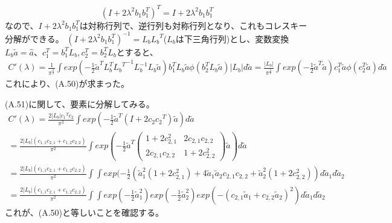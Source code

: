 \documentclass{jsarticle}
\begin{document}
\begin{equation}
(I + 2\lambda^2 b_1 b_1^T)^T = I + 2\lambda^2 b_1 b_1^T
\end{equation}
なので、$I + 2\lambda^2 b_1 b_1^T$は対称行列で、逆行列も対称行列となり、これもコレスキー分解ができる。
$(I + 2\lambda^2 b_1 b_1^T)^{-1} = L_b {L_b}^T$($L_b$は下三角行列)とし、変数変換$L_b \tilde{a} = \hat{a}$、$c_1^T = b_1^T L_b, c_2^T = b_2^T L_b$とすると、
\begin{equation}
\begin{split}
C'(\lambda) = \frac{1}{{\pi}^{\frac{3}{2}}} \int exp(-\frac{1}{2} \tilde{a}^T L_b^T {{L_b}^T}^{-1} L_b^{-1} L_b \tilde{a}) b_1^T L_b \tilde{a} \phi(b_2^T L_b \tilde{a}) |L_b| d\tilde{a}
= \frac{|L_b|}{{\pi}^{\frac{3}{2}}} \int exp(-\frac{1}{2} \tilde{a}^T \tilde{a}) c_1^T \tilde{a} \phi(c_2^T \tilde{a}) d\tilde{a}
\end{split}
\end{equation}
これにより、(A.50)が求まった。

(A.51)に関して、要素に分解してみる。
\begin{equation}
\begin{split}
C'(\lambda) = \frac{2|L_b|{c_1}^T c_2}{\pi^{2}} \int exp(-\frac{1}{2}\tilde{a}^T(I + 2c_2 {c_2}^T)\tilde{a})d\tilde{a}\\
= \frac{2|L_b|(c_{1, 1}c_{2, 1} + c_{1, 2}c_{2, 2})}{\pi^{2}} \int exp(-\frac{1}{2}\tilde{a}^T
\begin{pmatrix}
1 + 2c_{2, 1}^2 & 2c_{2, 1}c_{2, 2}\\
2c_{2, 1}c_{2, 2} & 1+2c_{2, 2}^2
\end{pmatrix}
\tilde{a})d\tilde{a}\\
= \frac{2|L_b|(c_{1, 1}c_{2, 1} + c_{1, 2}c_{2, 2})}{\pi^{2}} \int \int exp(-\frac{1}{2}(\tilde{a}_{1}^2(1 + 2c_{2, 1}^2) + 4\tilde{a}_{1}\tilde{a}_{2}c_{2, 1}c_{2, 2} + \tilde{a}_{2}^2(1 + 2c_{2, 2}^2))d\tilde{a}_1d\tilde{a}_2\\
= \frac{2|L_b|(c_{1, 1}c_{2, 1} + c_{1, 2}c_{2, 2})}{\pi^{2}} \int \int exp(-\frac{1}{2}\tilde{a}_{1}^2)exp(-\frac{1}{2}\tilde{a}_{2}^2)exp(-(c_{2, 1} \tilde{a}_{1} + c_{2, 2} \tilde{a}_{2})^2)d\tilde{a}_1d\tilde{a}_2
\end{split}
\end{equation}
これが、(A.50)と等しいことを確認する。
\end{document}
